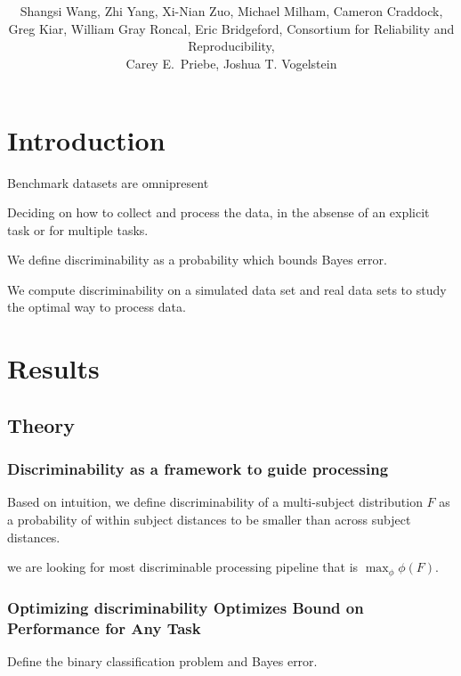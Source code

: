 \documentclass{article}
\title{\vspace{-50pt}
\db{Optimal Design for Discovery Science via Maximizing Discriminability: \\ Applications in Neuroimaging}
}
\author{Shangsi Wang, Zhi Yang, Xi-Nian Zuo, Michael Milham, Cameron Craddock,  \\ 
Greg Kiar, William Gray Roncal, Eric Bridgeford,
Consortium for Reliability and Reproducibility, \\ Carey E.~Priebe, Joshua T. Vogelstein}
\begin{document}
\maketitle
\tableofcontents
\newpage

\section{Introduction}

 Benchmark datasets are omnipresent

 Deciding on how to collect and process the data, in the absense of an explicit task or for multiple tasks.

 We define discriminability as a probability which bounds Bayes error.

 We compute discriminability on a simulated data set and real data sets to study the optimal way to process data.



\section{Results}



\subsection{Theory}

\subsubsection{Discriminability as a framework to guide processing}
 Based on intuition, we define discriminability of a multi-subject distribution $F$ as a probability of within subject distances to be smaller than across subject distances.

 we are looking for most discriminable processing pipeline that is $\max_\phi \phi(F)$.



\subsubsection{Optimizing discriminability Optimizes Bound on Performance for Any Task}

 Define the binary classification problem and Bayes error.
\end{document}
